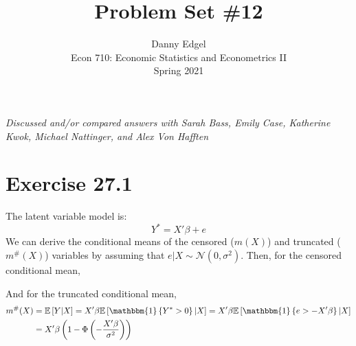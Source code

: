 \documentclass{article}
\newcommand{\N}{\mathcal{N}}
\newcommand{\one}[1]{\mathbbm{1}\left\{#1\right\}}
\newcommand{\E}[1]{\mathbb{E}\left[#1\right]}%
\begin{document}

\title{	Problem Set \#12 }
\author{ 	Danny Edgel 										\\ 
			Econ 710: Economic Statistics and Econometrics II	\\
			Spring 2021											\\
		}
\maketitle\thispagestyle{empty}


\noindent\textit{Discussed and/or compared answers with Sarah Bass, Emily Case, Katherine Kwok, Michael Nattinger, and Alex Von Hafften}



\section*{Exercise 27.1}
The latent variable model is:
\[
	Y^* = X'\beta + e
\]
We can derive the conditional means of the censored ($m(X)$) and truncated ($m^{\#}(X)$) variables by assuming that ${e|X\sim\N(0,\sigma^2)}$. Then, for the censored conditional mean,

And for the truncated conditional mean,
\begin{align*}
	m^{\#}(X)	&= \E{Y|X} = X'\beta \E{\one{Y^*>0}|X} = X'\beta \E{\one{e>-X'\beta}|X}	\\
				&= X'\beta\left(1-\Phi\left(-\frac{X'\beta}{\sigma^2}\right)\right)
\end{align*}
\end{document}
